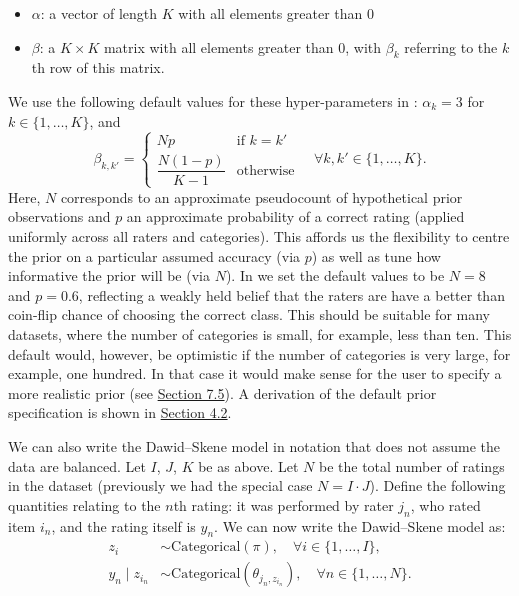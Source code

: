 \begin{itemize}
\item
  \(\alpha\): a vector of length \(K\) with all elements greater than 0
\item
  \(\beta\): a \(K \times K\) matrix with all elements greater than 0,
  with \(\beta_k\) referring to the \(k\)th row of this matrix.
\end{itemize}

We use the following default values for these hyper-parameters in
: \(\alpha_k = 3\) for
\(k \in \{1, \dots, K\}\), and
\[
    \beta_{k, k'} =
    \begin{cases}
           N      p          & \textrm{if } k = k' \\
    \dfrac{N (1 - p)}{K - 1} & \textrm{otherwise}
    \end{cases}
    \quad \forall k, k' \in \{1, \dots, K\}.
\]
Here, \(N\) corresponds to an approximate pseudocount of hypothetical
prior observations and \(p\) an approximate probability of a correct
rating (applied uniformly across all raters and categories). This
affords us the flexibility to centre the prior on a particular assumed
accuracy (via \(p\)) as well as tune how informative the prior will be
(via \(N\)). In  we set the default values to be \(N = 8\) and \(p = 0.6\),
reflecting a weakly held belief that the raters are have a better than coin-flip
chance of choosing the correct class. This should be suitable for many datasets,
where the number of categories is small, for example, less than ten.
This default would, however, be optimistic if the number of categories is very
large, for example, one hundred. In that case it would make sense for the user
to specify a more realistic prior (see \protect\hyperlink{sec:different-models-priors}{Section 7.5}).
A derivation of the default prior specification
is shown in \protect\hyperlink{sec:hyper-parameters}{Section 4.2}.

We can also write the Dawid--Skene model in notation that does not
assume the data are balanced. Let \(I\), \(J\), \(K\) be as above. Let \(N\) be
the total number of ratings in the dataset (previously we had the
special case \(N = I \cdot J\)). Define the following quantities relating
to the \(n\)th rating: it was performed by rater \(j_n\), who rated item
\(i_n\), and the rating itself is \(y_n\). We can now write the Dawid--Skene
model as:
\[
\begin{aligned}
z_i &\sim
    \textrm{Categorical}(\pi),
    \quad \forall i \in \{1, \dots, I\}, \\
y_n \mid z_{i_n} &\sim
    \textrm{Categorical}
    (\theta_{j_n, z_{i_n}}),
    \quad \forall n \in \{1, \dots, N\}.
\end{aligned}
\]

